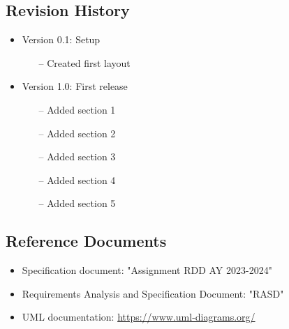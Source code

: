 \documentclass[../DD.tex]{subfiles}
\begin{document}
    \subsection{Revision History}\label{subsec:revision_history}
    \begin{itemize}
        \item Version 0.1: Setup
        \begin{itemize}
            \item[--] Created first layout 
        \end{itemize}
        \item Version 1.0: First release
        \begin{itemize}
            \item[--] Added section 1
            \item[--] Added section 2
            \item[--] Added section 3
            \item[--] Added section 4
            \item[--] Added section 5 
        \end{itemize}
    \end{itemize}

    \subsection{Reference Documents}\label{subsec:reference_documents}
    \begin{itemize}
        \item Specification document: "Assignment RDD AY 2023-2024"
        \item Requirements Analysis and Specification Document: "RASD"
        \item UML documentation: \url{https://www.uml-diagrams.org/}
    \end{itemize}
\end{document}
